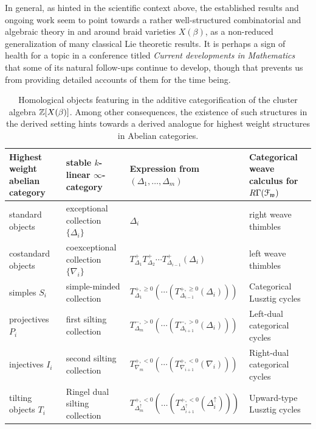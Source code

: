 In general, as hinted in the scientific context above, the established results and ongoing work seem to point towards a rather well-structured combinatorial and algebraic theory in and around braid varieties $X(\beta)$, as a non-reduced generalization of many classical Lie theoretic results. It is perhaps a sign of health for a topic in a conference titled {\it Current developments in Mathematics} that some of its natural follow-ups continue to develop, though that prevents us from providing detailed accounts of them for the time being.\\

\small
\begin{table}[htbp]
  \centering
  \caption{Homological objects featuring in the additive categorification of the cluster algebra $\Z[X(\beta)]$. Among other consequences, the existence of such structures in the derived setting hints towards a derived analogue for highest weight structures in Abelian categories.}\label{table:intro_homological}
\begin{tabular}{ |P{3cm}|P{5cm}|P{4cm}|P{5cm}|}
	\hline
    
	{\bf Highest weight abelian category} & {\bf stable $k$-linear $\infty$-category} & {\bf Expression from $(\Delta_1,\ldots,\Delta_m)$} & {\bf Categorical weave calculus for $R\Gamma(\mathcal{F}_{\mathfrak{w}})$}\\
	\hline

    standard objects & exceptional collection $\{\Delta_i\}$ & $\Delta_i$ & right weave thimbles\\
	\hline

    \rule{0pt}{0.5cm}costandard objects & coexceptional collection $\{\nabla_i\}$ & $T_{\Delta_1}^+T_{\Delta_2}^+\cdots T_{\Delta_{i-1}}^+(\Delta_i)$ & left weave thimbles\\
	\hline

    \rule{0pt}{0.5cm}simples $S_i$ & simple-minded collection & $T_{\Delta_{1}}^{+,\geq 0}(\cdots (T_{\Delta_{i-1}}^{+,\geq 0}(\Delta_i)))$ & Categorical Lusztig cycles\\
	\hline

    \rule{0pt}{0.5cm}projectives $P_i$ & first silting collection & $T_{\Delta_{m}}^{-,>0}(\cdots (T_{\Delta_{i+1}}^{-,>0}(\Delta_i)))$ & Left-dual categorical cycles\\
    \hline

    \rule{0pt}{0.5cm}injectives $I_i$ & second silting collection & $T_{\nabla_{m}}^{+,<0}(\cdots (T_{\nabla_{i+1}}^{+,<0}(\nabla_i)))$ & Right-dual categorical cycles\\
    \hline

    \rule{0pt}{0.5cm}tilting objects $T_i$ & Ringel dual silting collection & $T^{+,<0}_{\Delta_{m}^{\uparrow}}(\dots (T^{+,<0}_{\Delta_{i+1}^{\uparrow}}(\Delta_i^{\uparrow})))$ & Upward-type Lusztig cycles\\
    \hline
\end{tabular}
\end{table}
